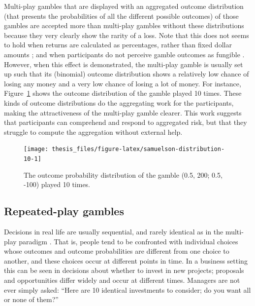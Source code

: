 \documentclass[a4paper, nobind, dvipsnames]{templates/ociamthesis}
\theoremstyle{definition}
\theoremstyle{definition}
\theoremstyle{definition}
\theoremstyle{definition}
\theoremstyle{remark}
\begin{document}
Multi-play gambles that are displayed with an aggregated outcome distribution
(that presents the probabilities of all the different possible outcomes) of
those gambles are accepted more than multi-play gambles without these
distributions \autocite{benartzi1999,redelmeier1992,klos2013,webb2017,coombs1971,venkatraman2006,dekay2005,langer2001,keren1991} because they
very clearly show the rarity of a loss. Note that this does not seems to hold
when returns are calculated as percentages, rather than fixed dollar amounts
\autocite{stutzer2013}; and when participants do not perceive gamble outcomes as
fungible \autocite{dekay2005}. However, when this effect is demonstrated, the multi-play
gamble is usually set up such that its (binomial) outcome distribution shows a
relatively low chance of losing any money and a very low chance of losing a lot
of money. For instance, Figure~\ref{fig:samuelson-distribution-10} shows the
outcome distribution of the \textcite{samuelson1963} gamble played 10 times. These kinds
of outcome distributions do the aggregating work for the participants, making
the attractiveness of the multi-play gamble clearer. This work suggests that
participants can comprehend and respond to aggregated risk, but that they
struggle to compute the aggregation without external help.



\begin{figure}
\texttt{[image: thesis\_files/figure-latex/samuelson-distribution-10-1]} \caption{The outcome probability distribution of the \textcite{samuelson1963} gamble (0.5, 200; 0.5, -100) played 10 times.}\label{fig:samuelson-distribution-10}
\end{figure}

\subsection{Repeated-play gambles}

Decisions in real life are usually sequential, and rarely identical as in the
multi-play paradigm \autocite[cf.][]{barron2003}. That is, people tend to be confronted
with individual choices whose outcomes and outcome probabilities are different
from one choice to another, and these choices occur at different points in time.
In a business setting this can be seen in decisions about whether to invest in
new projects; proposals and opportunities differ widely and occur at different
times. Managers are not ever simply asked: ``Here are 10 identical investments to
consider; do you want all or none of them?''
\end{document}
